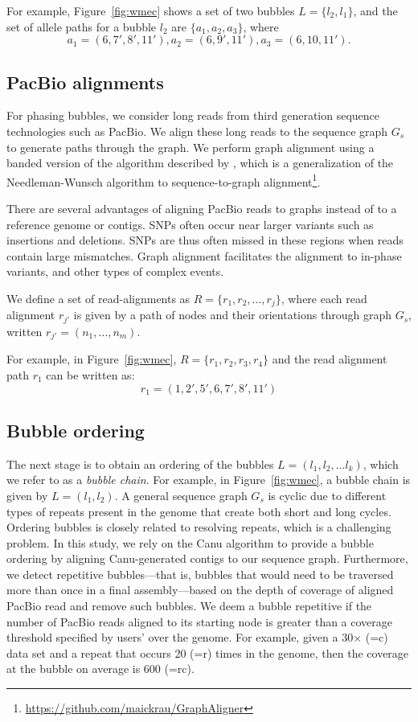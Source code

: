 For example, Figure~\ref{fig:wmec} shows a set of two bubbles $L=\{l_2, l_1\}$, and  the set of allele paths for a 
bubble $l_2$ are $\{a_1, a_2, a_3\}$,
where \[a_1 = (6, 7', 8', 11'), a_2 = (6, 9', 11'), a_3=  (6, 10, 11').\]

\subsection{PacBio alignments} 
For phasing bubbles, we consider long reads from third generation sequence technologies such as PacBio.
We align these long reads to the sequence graph $G_s$ to generate paths through the graph.
We perform graph alignment using a banded version of the algorithm described by \cite{rautiainen2017aligning}, which is a generalization of the Needleman-Wunsch algorithm to sequence-to-graph alignment\footnote{\url{https://github.com/maickrau/GraphAligner}}.

There are several advantages of aligning PacBio reads to graphs instead of to a reference genome or contigs.
SNPs often occur near larger variants such as insertions and deletions. SNPs are thus often missed in these regions when reads contain large mismatches. Graph alignment facilitates the alignment to in-phase variants, and other types of complex events.

\begin{definition}[Alignment]
We define a set of read-alignments as $R=\{r_1, r_2, \ldots, r_j\}$, where each read alignment $r_{j'}$ is given by a path of nodes and their orientations through graph $G_s$, written $r_{j'}=(n_1, \ldots, n_m)$.
\end{definition}
For example, in Figure~\ref{fig:wmec}, $R = \{r_1, r_2, r_3, r_4\}$ and the read alignment path $r_1$ can be written as:
\[r_1 = (1, 2', 5', 6, 7', 8', 11' ) \]


\subsection{Bubble ordering}
The next stage is to obtain an ordering of the bubbles $L=(l_1, l_2, \ldots l_k)$, which we refer to as a \emph{bubble chain}. 
For example, in Figure~\ref{fig:wmec}, a bubble chain is given by $L=(l_1, l_2)$.
A general sequence graph $G_s$ is cyclic due to different types of repeats present in the genome that create both short and long cycles.
Ordering bubbles is closely related to resolving repeats, which is a challenging problem.
In this study, we rely on the Canu algorithm \citep{koren2017canu} to provide a bubble ordering by aligning Canu-generated contigs to our sequence graph.
Furthermore, we detect repetitive bubbles---that is, bubbles that would need to be traversed more than once in a final assembly---based on the depth of coverage of aligned PacBio read and remove such bubbles.
We deem a bubble repetitive if the number of PacBio reads aligned to its starting node is greater than a coverage threshold specified by users' over the genome.
For example, given a 30$\times$ (=c) data set and a repeat that occurs 20 (=r) times in the genome, then the coverage at the bubble on average is 600 (=rc).

